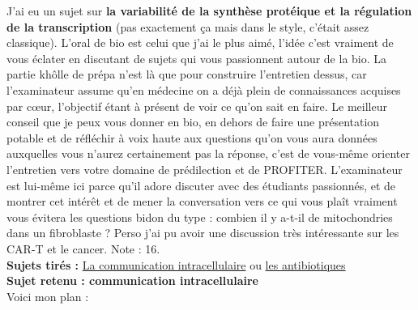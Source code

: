 \lettrine{{\color{yellow!80!black} \oldpilcrowfive}}{}
J’ai eu un sujet sur \textbf{la variabilité de la synthèse protéique et la régulation de la transcription} (pas exactement ça mais dans le style, c’était assez classique). L’oral de bio est celui que j’ai le plus aimé, l’idée c’est vraiment de vous éclater en discutant de sujets qui vous passionnent autour de la bio. La partie khôlle de prépa n’est là que pour construire l’entretien dessus, car l’examinateur assume qu’en médecine on a déjà plein de connaissances acquises par cœur, l’objectif étant à présent de voir ce qu’on sait en faire. Le meilleur conseil que je peux vous donner en bio, en dehors de faire une présentation potable et de réfléchir à voix haute aux questions qu’on vous aura données auxquelles vous n’aurez certainement pas la réponse, c’est de vous-même orienter l’entretien vers votre domaine de prédilection et de PROFITER. L’examinateur est lui-même ici parce qu’il adore discuter avec des étudiants passionnés, et de montrer cet intérêt et de mener la conversation vers ce qui vous plaît vraiment vous évitera les questions bidon du type : combien il y a-t-il de mitochondries dans un fibroblaste ? Perso j’ai pu avoir une discussion très intéressante sur les CAR-T et le cancer. Note : 16.\\

\newpage
\lettrine{{\color{violet} \oldpilcrowfive}}{}
\textbf{Sujets tirés :} \uline{La communication intracellulaire} ou \uline{les antibiotiques}\\
\textbf{Sujet retenu : communication intracellulaire}\\

Voici mon plan :

